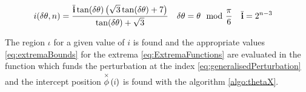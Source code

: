 
\begin{align*}
 i(\delta\theta, n) &= \frac{\overline{\mathbf{i}} \tan (\delta \theta ) \left(\sqrt{3} \tan (\delta \theta )+7\right)}{\tan (\delta \theta )+\sqrt{3}} &
  \delta\theta &= \theta \mod{\frac{\pi}{6} } &
  \overline{\mathbf{i}} & = 2^{n-3} 
\end{align*}

The region $\iota$ for a given value of $i$ is found and the appropriate values  \ref{eq:extremaBounds} for the extrema \ref{eq:ExtremaFunctions} are evaluated in the function which funds the perturbation at the index \ref{eq:generalisedPerturbation} and the intercept position $\thetaX{i}$ is found with the algorithm \ref{algo:thetaX}.

